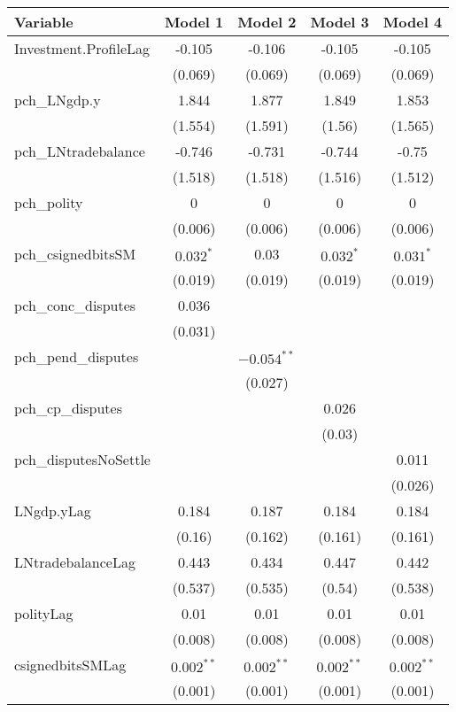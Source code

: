 \begin{table}[ht]
\centering
\begin{tabular}{lcccc}
 Variable & Model 1 & Model 2 & Model 3 & Model 4 \\ 
  \hline
\hline
Investment.ProfileLag & -0.105 & -0.106 & -0.105 & -0.105 \\ 
   & (0.069) & (0.069) & (0.069) & (0.069) \\ 
   \hline
pch\_LNgdp.y & 1.844 & 1.877 & 1.849 & 1.853 \\ 
   & (1.554) & (1.591) & (1.56) & (1.565) \\ 
  pch\_LNtradebalance & -0.746 & -0.731 & -0.744 & -0.75 \\ 
   & (1.518) & (1.518) & (1.516) & (1.512) \\ 
  pch\_polity & 0 & 0 & 0 & 0 \\ 
   & (0.006) & (0.006) & (0.006) & (0.006) \\ 
  pch\_csignedbitsSM & $0.032^{\ast}$ & 0.03 & $0.032^{\ast}$ & $0.031^{\ast}$ \\ 
   & (0.019) & (0.019) & (0.019) & (0.019) \\ 
  pch\_conc\_disputes & 0.036 &  &  &  \\ 
   & (0.031) &  &  &  \\ 
  pch\_pend\_disputes &  & $-0.054^{\ast\ast}$ &  &  \\ 
   &  & (0.027) &  &  \\ 
  pch\_cp\_disputes &  &  & 0.026 &  \\ 
   &  &  & (0.03) &  \\ 
  pch\_disputesNoSettle &  &  &  & 0.011 \\ 
   &  &  &  & (0.026) \\ 
   \hline
LNgdp.yLag & 0.184 & 0.187 & 0.184 & 0.184 \\ 
   & (0.16) & (0.162) & (0.161) & (0.161) \\ 
  LNtradebalanceLag & 0.443 & 0.434 & 0.447 & 0.442 \\ 
   & (0.537) & (0.535) & (0.54) & (0.538) \\ 
  polityLag & 0.01 & 0.01 & 0.01 & 0.01 \\ 
   & (0.008) & (0.008) & (0.008) & (0.008) \\ 
  csignedbitsSMLag & $0.002^{\ast\ast}$ & $0.002^{\ast\ast}$ & $0.002^{\ast\ast}$ & $0.002^{\ast\ast}$ \\ 
   & (0.001) & (0.001) & (0.001) & (0.001) \\ 

\end{tabular}
\end{table}
